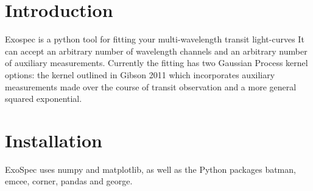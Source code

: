 \hypertarget{index_intro_sec}{}\section{Introduction}\label{index_intro_sec}
Exospec is a python tool for fitting your multi-\/wavelength transit light-\/curves It can accept an arbitrary number of wavelength channels and an arbitrary number of auxiliary measurements. Currently the fitting has two Gaussian Process kernel options\+: the kernel outlined in Gibson 2011 which incorporates auxiliary measurements made over the course of transit observation and a more general squared exponential. \hypertarget{index_install_sec}{}\section{Installation}\label{index_install_sec}
Exo\+Spec uses numpy and matplotlib, as well as the Python packages batman, emcee, corner, pandas and george. 